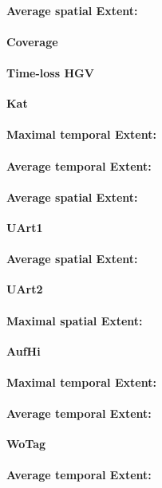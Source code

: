 \begin{table}[ht]
\paragraph{Average spatial Extent:}
\paragraph{Coverage}
\paragraph{Time-loss HGV}

\large
\centerline{\textbf{Kat}}
\normalsize

\paragraph{Maximal temporal Extent:}
\paragraph{Average temporal Extent:}
\paragraph{Average spatial Extent:}

\large
\centerline{\textbf{UArt1}}
\normalsize

\paragraph{Average spatial Extent:}

\large
\centerline{\textbf{UArt2}}
\normalsize

\paragraph{Maximal spatial Extent:}

\large
\centerline{\textbf{AufHi}}
\normalsize

\paragraph{Maximal temporal Extent:}
\paragraph{Average temporal Extent:}


\large
\centerline{\textbf{WoTag}}
\normalsize

\paragraph{Average temporal Extent:}

\end{table}
